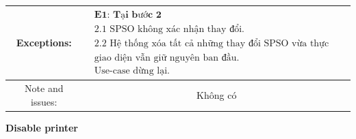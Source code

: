\begin{tabular}{|c|c|c|c|}
\hline Exceptions: & \multicolumn{3}{|c|}{$\begin{array}{l}
\textbf { E1: Tại bước 2 } \\
\text { 2.1 SPSO không xác nhận thay đổi.} \\
\text { 2.2 Hệ thống xóa tất cả những thay đổi SPSO vừa thực hiện,} \\
\text { giao diện vẫn giữ nguyên ban đầu.} \\
\text { Use-case dừng lại.} 
\text {}\end{array}$} \\
\hline Note and issues: & \multicolumn{3}{|c|}{ Không có } \\
\hline
\end{tabular}

\vspace{1cm}
\textbf{Disable printer}\par
